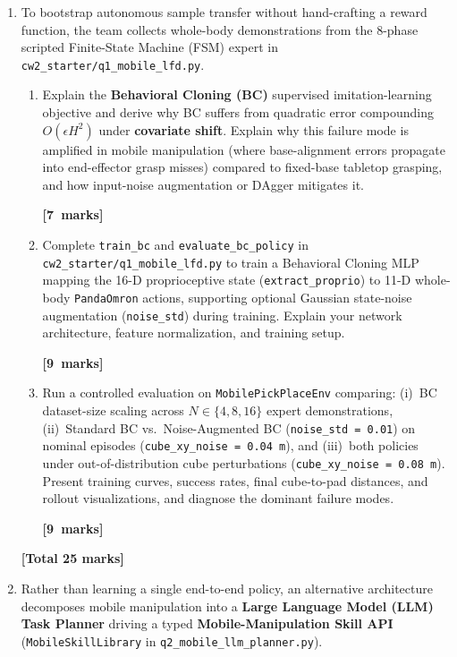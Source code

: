 \documentclass[11pt,a4paper]{article}
\newcommand{\qmarks}[1]{\par\nopagebreak\noindent\hfill\mbox{\textbf{[#1 marks]}}}
\newcommand{\qtotal}[1]{\par\smallskip\noindent\hfill\textbf{[Total #1 marks]}\par\medskip}
\begin{document}
\begin{enumerate}[label=\textbf{\arabic*.}, leftmargin=1.4em, itemsep=1.0em]

\item To bootstrap autonomous sample transfer without hand-crafting a reward function, the team collects whole-body demonstrations from the 8-phase scripted Finite-State Machine (FSM) expert in \texttt{cw2\_starter/q1\_mobile\_lfd.py}.
\begin{enumerate}[label=\textbf{\alph*.}, leftmargin=1.6em, itemsep=0.45em]
    \item Explain the \textbf{Behavioral Cloning (BC)} supervised imitation-learning objective and derive why BC suffers from quadratic error compounding $O(\epsilon H^2)$ under \textbf{covariate shift}. Explain why this failure mode is amplified in mobile manipulation (where base-alignment errors propagate into end-effector grasp misses) compared to fixed-base tabletop grasping, and how input-noise augmentation or DAgger mitigates it. \qmarks{7}

    \item Complete \texttt{train\_bc} and \texttt{evaluate\_bc\_policy} in \texttt{cw2\_starter/q1\_mobile\_lfd.py} to train a Behavioral Cloning MLP mapping the 16-D proprioceptive state (\texttt{extract\_proprio}) to 11-D whole-body \texttt{PandaOmron} actions, supporting optional Gaussian state-noise augmentation (\texttt{noise\_std}) during training. Explain your network architecture, feature normalization, and training setup. \qmarks{9}

    \item Run a controlled evaluation on \texttt{MobilePickPlaceEnv} comparing: (i)~BC dataset-size scaling across $N \in \{4, 8, 16\}$ expert demonstrations, (ii)~Standard BC vs.\ Noise-Augmented BC (\texttt{noise\_std = 0.01}) on nominal episodes (\texttt{cube\_xy\_noise = 0.04\,m}), and (iii)~both policies under out-of-distribution cube perturbations (\texttt{cube\_xy\_noise = 0.08\,m}). Present training curves, success rates, final cube-to-pad distances, and rollout visualizations, and diagnose the dominant failure modes. \qmarks{9}
\end{enumerate}
\qtotal{25}

\item Rather than learning a single end-to-end policy, an alternative architecture decomposes mobile manipulation into a \textbf{Large Language Model (LLM) Task Planner} driving a typed \textbf{Mobile-Manipulation Skill API} (\texttt{MobileSkillLibrary} in \texttt{q2\_mobile\_llm\_planner.py}).


\end{enumerate}
\end{document}

